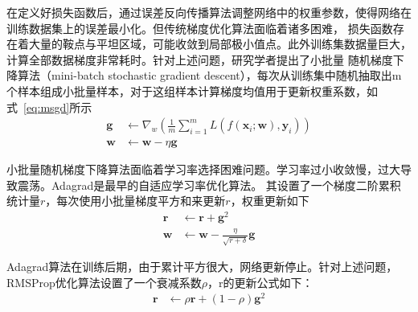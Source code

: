 在定义好损失函数后，通过误差反向传播算法调整网络中的权重参数，使得网络在训练数据集上的误差最小化。但传统梯度优化算法面临着诸多困难，
损失函数存在着大量的鞍点与平坦区域，可能收敛到局部极小值点。此外训练集数据量巨大，计算全部数据梯度非常耗时。针对上述问题，研究学者提出了小批量
随机梯度下降算法（mini-batch stochastic gradient descent），每次从训练集中随机抽取出m个样本组成小批量样本，对于这组样本计算梯度均值用于更新权重系数，如式~\ref{eq:msgd}所示
\begin{equation}
  \begin{aligned}
    \boldsymbol{g}  & \leftarrow \nabla_{w}\left(\frac{1}{m} \sum_{i=1}^{m} L\left(f\left(\boldsymbol{x}_{i} ; \boldsymbol{w}\right), \boldsymbol{y}_{i}\right)\right) \\
    \boldsymbol{w}  & \leftarrow  \boldsymbol{w} - \eta \boldsymbol{g}
  \end{aligned}
  \label{eq:msgd}
\end{equation}

小批量随机梯度下降算法面临着学习率选择困难问题。学习率过小收敛慢，过大导致震荡。Adagrad是最早的自适应学习率优化算法。
其设置了一个梯度二阶累积统计量$r$，每次使用小批量梯度平方和来更新$r$，权重更新如下
\begin{equation}
  \begin{aligned}
    \boldsymbol{r}  & \leftarrow   \boldsymbol{r}  +  \boldsymbol{g}^2\\
    \boldsymbol{w}  & \leftarrow  \boldsymbol{w} - \frac{\eta}{\sqrt{r + \delta}} \boldsymbol{g}
  \end{aligned}
  \label{eq:adagrad}
\end{equation}

Adagrad算法在训练后期，由于累计平方很大，网络更新停止。针对上述问题，RMSProp优化算法设置了一个衰减系数$\rho$，r的更新公式如下：
\begin{equation}
  \begin{aligned}
    \boldsymbol{r}  & \leftarrow  \rho \boldsymbol{r}  + (1-\rho) \boldsymbol{g}^2\\
  \end{aligned}
  \label{eq:Rmsprop}
\end{equation}

